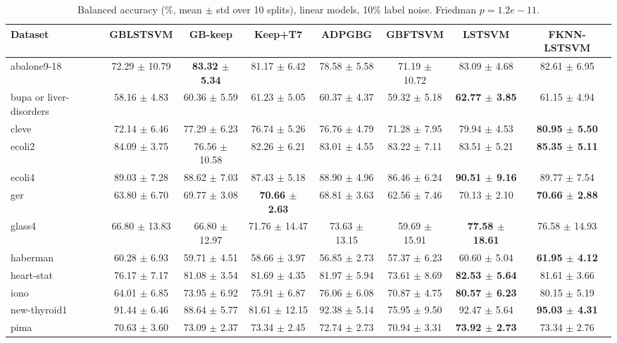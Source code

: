 \begin{table}[t]
\centering\small
\caption{Balanced accuracy (\%, mean $\pm$ std over 10 splits), linear models, 10\% label noise. Friedman $p = 1.2e-11$.}
\begin{tabular}{lccccccc}
\toprule
Dataset & GBLSTSVM & GB-keep & Keep+T7 & ADPGBG & GBFTSVM & LSTSVM & FKNN-LSTSVM \\
\midrule
abalone9-18 & 72.29 $\pm$ 10.79 & \textbf{83.32 $\pm$ 5.34} & 81.17 $\pm$ 6.42 & 78.58 $\pm$ 5.58 & 71.19 $\pm$ 10.72 & 83.09 $\pm$ 4.68 & 82.61 $\pm$ 6.95 \\
bupa or liver-disorders & 58.16 $\pm$ 4.83 & 60.36 $\pm$ 5.59 & 61.23 $\pm$ 5.05 & 60.37 $\pm$ 4.37 & 59.32 $\pm$ 5.18 & \textbf{62.77 $\pm$ 3.85} & 61.15 $\pm$ 4.94 \\
cleve & 72.14 $\pm$ 6.46 & 77.29 $\pm$ 6.23 & 76.74 $\pm$ 5.26 & 76.76 $\pm$ 4.79 & 71.28 $\pm$ 7.95 & 79.94 $\pm$ 4.53 & \textbf{80.95 $\pm$ 5.50} \\
ecoli2 & 84.09 $\pm$ 3.75 & 76.56 $\pm$ 10.58 & 82.26 $\pm$ 6.21 & 83.01 $\pm$ 4.55 & 83.22 $\pm$ 7.11 & 83.51 $\pm$ 5.21 & \textbf{85.35 $\pm$ 5.11} \\
ecoli4 & 89.03 $\pm$ 7.28 & 88.62 $\pm$ 7.03 & 87.43 $\pm$ 5.18 & 88.90 $\pm$ 4.96 & 86.46 $\pm$ 6.24 & \textbf{90.51 $\pm$ 9.16} & 89.77 $\pm$ 7.54 \\
ger & 63.80 $\pm$ 6.70 & 69.77 $\pm$ 3.08 & \textbf{70.66 $\pm$ 2.63} & 68.81 $\pm$ 3.63 & 62.56 $\pm$ 7.46 & 70.13 $\pm$ 2.10 & \textbf{70.66 $\pm$ 2.88} \\
glass4 & 66.80 $\pm$ 13.83 & 66.80 $\pm$ 12.97 & 71.76 $\pm$ 14.47 & 73.63 $\pm$ 13.15 & 59.69 $\pm$ 15.91 & \textbf{77.58 $\pm$ 18.61} & 76.58 $\pm$ 14.93 \\
haberman & 60.28 $\pm$ 6.93 & 59.71 $\pm$ 4.51 & 58.66 $\pm$ 3.97 & 56.85 $\pm$ 2.73 & 57.37 $\pm$ 6.23 & 60.60 $\pm$ 5.04 & \textbf{61.95 $\pm$ 4.12} \\
heart-stat & 76.17 $\pm$ 7.17 & 81.08 $\pm$ 3.54 & 81.69 $\pm$ 4.35 & 81.97 $\pm$ 5.94 & 73.61 $\pm$ 8.69 & \textbf{82.53 $\pm$ 5.64} & 81.61 $\pm$ 3.66 \\
iono & 64.01 $\pm$ 6.85 & 73.95 $\pm$ 6.92 & 75.91 $\pm$ 6.87 & 76.06 $\pm$ 6.08 & 70.87 $\pm$ 4.75 & \textbf{80.57 $\pm$ 6.23} & 80.15 $\pm$ 5.19 \\
new-thyroid1 & 91.44 $\pm$ 6.46 & 88.64 $\pm$ 5.77 & 81.61 $\pm$ 12.15 & 92.38 $\pm$ 5.14 & 75.95 $\pm$ 9.50 & 92.47 $\pm$ 5.64 & \textbf{95.03 $\pm$ 4.31} \\
pima & 70.63 $\pm$ 3.60 & 73.09 $\pm$ 2.37 & 73.34 $\pm$ 2.45 & 72.74 $\pm$ 2.73 & 70.94 $\pm$ 3.31 & \textbf{73.92 $\pm$ 2.73} & 73.34 $\pm$ 2.76 \\

\end{tabular}
\end{table}
